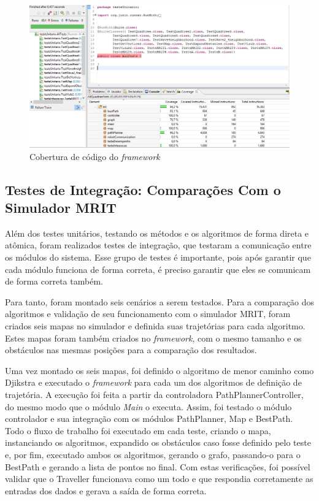 \begin{figure}[h]
	\centering
	\label{fig38}
		\includegraphics[keepaspectratio=true,scale=0.6]{figuras/cobertura.png}
	\caption{Cobertura de código do \textit{framework}}
\end{figure}

\subsection{Testes de Integração: Comparações Com o Simulador MRIT}

Além dos testes unitários, testando os métodos e os algoritmos de forma direta e atômica, foram realizados testes de integração, que testaram a comunicação entre os módulos do sistema. Esse grupo de testes é importante, pois após garantir que cada módulo funciona de forma correta, é preciso garantir que eles se comunicam de forma correta também.

Para tanto, foram montado seis cenários a serem testados. Para a comparação dos algoritmos e validação de seu funcionamento com o simulador MRIT, foram criados seis mapas no simulador e definida suas trajetórias para cada algoritmo. Estes mapas foram também criados no \textit{framework}, com o mesmo tamanho e os obstáculos nas mesmas posições para a comparação dos resultados.

Uma vez montado os seis mapas, foi definido o algoritmo de menor caminho como Djikstra e executado o \textit{framework} para cada um dos algoritmos de definição de trajetória. A execução foi feita a partir da controladora PathPlannerController, do mesmo modo que o módulo \textit{Main} o executa. Assim, foi testado o módulo controlador e sua integração com os módulos PathPlanner, Map e BestPath. Todo o fluxo de trabalho foi executado em cada teste, criando o mapa, instanciando os algoritmos, expandido os obstáculos caso fosse definido pelo teste e, por fim, executado ambos os algoritmos, gerando o grafo, passando-o para o BestPath e gerando a lista de pontos no final. Com estas verificações, foi possível validar que o Traveller funcionava como um todo e que respondia corretamente as entradas dos dados e gerava a saída de forma correta.

